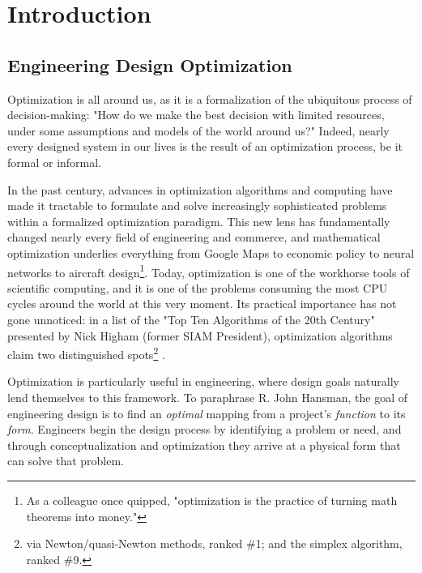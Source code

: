 \chapter{Introduction}


\section{Engineering Design Optimization}

Optimization is all around us, as it is a formalization of the ubiquitous process of decision-making: "How do we make the best decision with limited resources, under some assumptions and models of the world around us?" Indeed, nearly every designed system in our lives is the result of an optimization process, be it formal or informal.


In the past century, advances in optimization algorithms and computing have made it tractable to formulate and solve increasingly sophisticated problems within a formalized optimization paradigm. This new lens has fundamentally changed nearly every field of engineering and commerce, and mathematical optimization underlies everything from Google Maps to economic policy to neural networks to aircraft design\footnote{As a colleague once quipped, "optimization is the practice of turning math theorems into money."}. Today, optimization is one of the workhorse tools of scientific computing, and it is one of the problems consuming the most CPU cycles around the world at this very moment. Its practical importance has not gone unnoticed: in a list of the "Top Ten Algorithms of the 20th Century" presented by Nick Higham (former SIAM President), optimization algorithms claim two distinguished spots\footnote{via Newton/quasi-Newton methods, ranked \#1; and the simplex algorithm, ranked \#9.} \cite{higham2016}.

Optimization is particularly useful in engineering, where design goals naturally lend themselves to this framework. To paraphrase R. John Hansman, the goal of engineering design is to find an \textit{optimal} mapping from a project's \textit{function} to its \textit{form}. Engineers begin the design process by identifying a problem or need, and through conceptualization and optimization they arrive at a physical form that can solve that problem.

